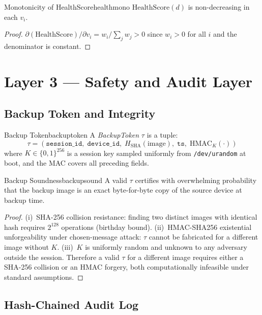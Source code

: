\documentclass[11pt,a4paper]{report}
\begin{document}
\begin{proposition}{Monotonicity of HealthScore}{healthmono}
$\mathrm{HealthScore}(d)$ is non-decreasing in each $v_i$.
\end{proposition}

\begin{proof}
$\partial(\mathrm{HealthScore})/\partial v_i = w_i / \sum_j w_j > 0$ since $w_i > 0$ for all $i$ and the denominator is constant.
\end{proof}

\chapter{Layer 3 --- Safety and Audit Layer}

\section{Backup Token and Integrity}

\begin{definition}{Backup Token}{backuptoken}
A \emph{BackupToken} $\tau$ is a tuple:
\[
  \tau = (\mathtt{session\_id},\; \mathtt{device\_id},\; H_{\mathrm{SHA}}(\text{image}),\; \mathtt{ts},\; \mathrm{HMAC}_K(\cdot))
\]
where $K \in \{0,1\}^{256}$ is a session key sampled uniformly from \texttt{/dev/urandom} at boot, and the MAC covers all preceding fields.
\end{definition}

\begin{theorem}{Backup Soundness}{backupsound}
A valid $\tau$ certifies with overwhelming probability that the backup image is an exact byte-for-byte copy of the source device at backup time.
\end{theorem}

\begin{proof}
(i)~SHA-256 collision resistance: finding two distinct images with identical hash requires $2^{128}$ operations (birthday bound). (ii)~HMAC-SHA256 existential unforgeability under chosen-message attack: $\tau$ cannot be fabricated for a different image without $K$. (iii)~$K$ is uniformly random and unknown to any adversary outside the session. Therefore a valid $\tau$ for a different image requires either a SHA-256 collision or an HMAC forgery, both computationally infeasible under standard assumptions.
\end{proof}

\section{Hash-Chained Audit Log}
\end{document}
